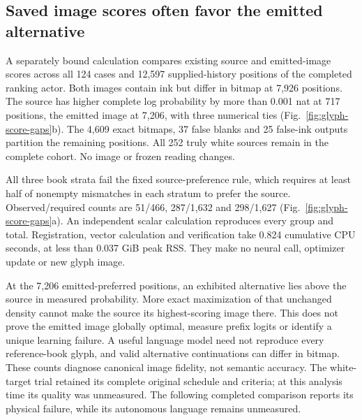\subsection*{Saved image scores often favor the emitted alternative}

A separately bound calculation compares existing source and emitted-image
scores across all 124 cases and 12,597 supplied-history positions of the
completed ranking actor. Both images contain ink but differ in bitmap at
7,926 positions. The source has higher complete log probability by more than
0.001 nat at 717 positions, the emitted image at 7,206, with three numerical
ties (Fig.~\ref{fig:glyph-score-gaps}b). The 4,609 exact bitmaps, 37 false blanks
and 25 false-ink outputs partition the remaining positions. All 252 truly white
sources remain in the complete cohort. No image or frozen reading changes.

All three book strata fail the fixed source-preference rule, which requires
at least half of nonempty mismatches in each stratum to prefer the source.
Observed/required counts are 51/466, 287/1,632 and 298/1,627
(Fig.~\ref{fig:glyph-score-gaps}a). An independent scalar calculation reproduces
every group and total. Registration, vector calculation and verification take
0.824 cumulative CPU seconds, at less than 0.037 GiB peak RSS. They make no
neural call, optimizer update or new glyph image.

At the 7,206 emitted-preferred positions, an exhibited alternative lies above
the source in measured probability. More exact maximization of that unchanged
density cannot make the source its highest-scoring image there. This does not
prove the emitted image globally optimal, measure prefix logits or identify a
unique learning failure. A useful language model need not reproduce every
reference-book glyph, and valid alternative continuations can differ in bitmap.
These counts diagnose canonical image fidelity, not semantic accuracy. The
white-target trial retained its complete original schedule and criteria; at this
analysis time its quality was unmeasured. The following completed comparison
reports its physical failure, while its autonomous language remains unmeasured.
